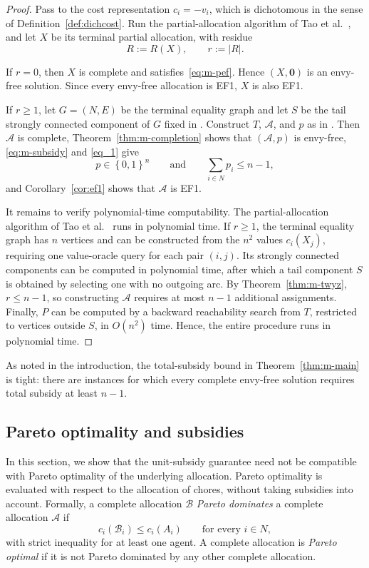 \documentclass[sigconf,anonymous]{aamas}
\newcommand{\agents}{N}
\newcommand{\alloc}{\mathcal{A}}
\newcommand{\allocB}{\mathcal{B}}
\newcommand{\bundle}[1]{A_{#1}}
\newcommand{\subsidy}{p}
\newcommand{\cost}{c}
\newcommand{\set}[1]{\left\{#1\right\}}
\newcommand{\abs}[1]{\left\lvert#1\right\rvert}
\theoremstyle{acmplain}
\theoremstyle{acmdefinition}
\theoremstyle{acmplain}
\begin{document}
\begin{proof}
Pass to the cost representation $\cost_i=-v_i$, which is dichotomous in the sense of Definition~\ref{def:dichcost}. Run the partial-allocation algorithm of Tao et al.~\cite{tao2025existence}, and let $X$ be its terminal partial allocation, with residue
\[ R:=R(X), \qquad r:=\abs R.
\]

If $r=0$, then $X$ is complete and satisfies~\eqref{eq:m-pef}. Hence $(X,\mathbf 0)$ is an envy-free solution. Since every envy-free allocation is EF1, $X$ is also EF1.

If $r\geq 1$, let $G=(\agents,E)$ be the terminal equality graph and let $S$ be the tail strongly connected component of $G$ fixed in . Construct $T$, $\alloc$, and $\subsidy$ as in . Then $\alloc$ is complete, Theorem~\ref{thm:m-completion} shows that $(\alloc,\subsidy)$ is envy-free, \eqref{eq:m-subsidy} and \eqref{eq_1} give \[
    \subsidy\in\set{0,1}^n
    \qquad\text{and}\qquad
    \sum_{i\in\agents}\subsidy_i\leq n-1,
\] and Corollary~\ref{cor:ef1} shows that $\alloc$ is EF1.

It remains to verify polynomial-time computability. The partial-allocation algorithm of Tao et al.~\cite{tao2025existence} runs in polynomial time. If $r\geq 1$, the terminal equality graph has $n$ vertices and can be constructed from the $n^2$ values $\cost_i(X_j)$, requiring one value-oracle query for each pair $(i,j)$. Its strongly connected components can be computed in polynomial time, after which a tail component $S$ is obtained by selecting one with no outgoing arc. By Theorem~\ref{thm:m-twyz}, $r\leq n-1$, so constructing $\alloc$ requires at most $n-1$ additional assignments. Finally, $P$ can be computed by a backward reachability search from $T$, restricted to vertices outside $S$, in $O(n^2)$ time. Hence, the entire procedure runs in polynomial time. \end{proof}

As noted in the introduction, the total-subsidy bound in Theorem~\ref{thm:m-main} is tight: there are instances for which every complete envy-free solution requires total subsidy at least \(n-1\).



\subsection{Pareto optimality and subsidies}
In this section, we show that the unit-subsidy guarantee need not be compatible with Pareto optimality of the underlying allocation. Pareto optimality is evaluated with respect to the allocation of chores, without taking subsidies into account. Formally, a complete allocation $\allocB$ \emph{Pareto dominates} a complete allocation $\alloc$ if
\[\cost_i(\allocB_i)\leq \cost_i(\bundle i)
    \qquad\text{for every }i\in\agents,
\]
with strict inequality for at least one agent. A complete allocation is \emph{Pareto optimal} if it is not Pareto dominated by any other complete allocation.
\end{document}
